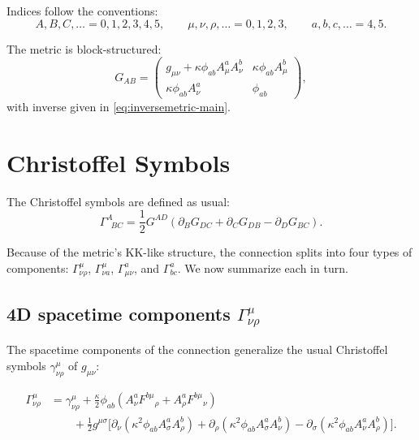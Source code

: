 \documentclass[12pt]{article}
\begin{document}
Indices follow the conventions:
\[
A,B,C,\dots = 0,1,2,3,4,5, \qquad
\mu,\nu,\rho,\dots = 0,1,2,3, \qquad
a,b,c,\dots = 4,5.
\]

The metric is block-structured:
\begin{equation}
G_{AB} =
\begin{pmatrix}
g_{\mu\nu} + \kappa\phi_{ab}A^a_\mu A^b_\nu & \kappa\phi_{ab}A^b_\mu \\
\kappa\phi_{ab}A^a_\nu & \phi_{ab}
\end{pmatrix},
\end{equation}
with inverse given in \eqref{eq:inversemetric-main}.


\newpage
\section{Christoffel Symbols}

The Christoffel symbols are defined as usual:
\begin{equation}
\Gamma^A_{\;\;BC} = 
\frac{1}{2} G^{AD} \left(\partial_B G_{DC} + \partial_C G_{DB} - \partial_D G_{BC}\right).
\end{equation}

Because of the metric's KK-like structure, the connection splits into
four types of components: \(\Gamma^\mu_{\nu\rho}\),
\(\Gamma^\mu_{\nu a}\), \(\Gamma^a_{\mu\nu}\), and \(\Gamma^a_{bc}\). We now
summarize each in turn.


\subsection{4D spacetime components \texorpdfstring{$\Gamma^\mu_{\nu\rho}$}{Gamma}}

The spacetime components of the connection generalize the usual Christoffel
symbols \(\gamma^\mu_{\nu\rho}\) of \(g_{\mu\nu}\):

\begin{align}
\Gamma^\mu_{\nu\rho}
&= \gamma^\mu_{\nu\rho}
+ \frac{\kappa}{2}\phi_{ab}
\left(
A^a_\nu F^{b\mu}{}_{\rho}
+ A^a_\rho F^{b\mu}{}_{\nu}
\right)
\nonumber\\
&\qquad
+ \frac{1}{2} g^{\mu\sigma}
\Big[
\partial_\nu(\kappa^2\phi_{ab}A^a_\sigma A^b_\rho)
+\partial_\rho(\kappa^2\phi_{ab}A^a_\sigma A^b_\nu)
-\partial_\sigma(\kappa^2\phi_{ab}A^a_\nu A^b_\rho)
\Big].
\label{eq:Gamma-munu}
\end{align}
\end{document}
